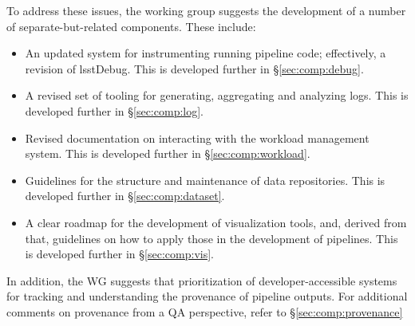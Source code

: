 To address these issues, the working group suggests the development of a
number of separate-but-related components. These include:

\begin{itemize}

  \item{An updated system for instrumenting running pipeline code;
  effectively, a revision of lsstDebug. This is developed further in
  \S\ref{sec:comp:debug}.}

  \item{A revised set of tooling for generating, aggregating and analyzing
  logs. This is developed further in \S\ref{sec:comp:log}.}

  \item{Revised documentation on interacting with the workload management
  system. This is developed further in \S\ref{sec:comp:workload}.}

  \item{Guidelines for the structure and maintenance of data repositories.
  This is developed further in \S\ref{sec:comp:dataset}.}

  \item{A clear roadmap for the development of visualization tools, and,
  derived from that, guidelines on how to apply those in the development of
  pipelines. This is developed further in \S\ref{sec:comp:vis}.}

\end{itemize}

In addition, the WG suggests that prioritization of developer-accessible
systems for tracking and understanding the \gls{provenance} of pipeline
outputs. For additional comments on provenance from a QA perspective, refer to
\S\ref{sec:comp:provenance}
